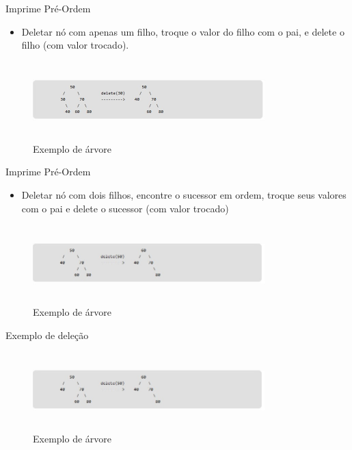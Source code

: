 \begin{frame}
	\begin{block}{Imprime Pré-Ordem}
		\begin{itemize}
			\item Deletar nó com apenas um filho, troque o valor do filho com o pai, e delete o filho (com valor trocado).
		\end{itemize}
		\begin{figure}[!htb]
			\centering	  				
			\includegraphics[height=3cm, width = 9cm]{./pic/delecao2.jpg}
			\caption{Exemplo de árvore}
			\label{fig_pilha}
		\end{figure}
	\end{block}
\end{frame}

\begin{frame}
	\begin{block}{Imprime Pré-Ordem}
		\begin{itemize}
			\item Deletar nó com dois filhos, encontre o sucessor em ordem, troque seus valores com  o pai e delete o sucessor (com valor trocado)
		\end{itemize}
		\begin{figure}[!htb]
			\centering	  				
			\includegraphics[height=3cm, width = 9cm]{./pic/delecao3.jpg}
			\caption{Exemplo de árvore}
			\label{fig_pilha}
		\end{figure}
	\end{block}
\end{frame}

\begin{frame}
	\begin{block}{Exemplo de deleção}
		\begin{figure}[!htb]
			\centering	  				
			\includegraphics[height=3cm, width = 9cm]{./pic/delecao3.jpg}
			\caption{Exemplo de árvore}
			\label{fig_pilha}
		\end{figure}
	\end{block}
\end{frame}

